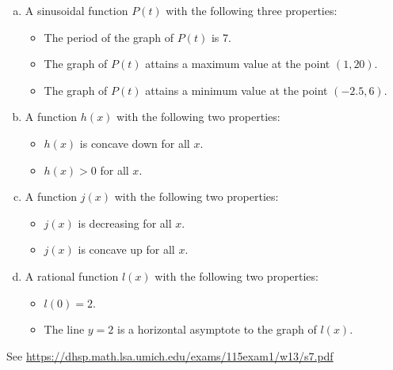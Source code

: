 \documentclass[11pt]{exam}
\begin{document}
\begin{questions}
\begin{enumerate}[(a)]
\item A sinusoidal function $P(t)$ with the following three properties:
\begin{itemize}
\item The period of the graph of $P(t)$ is 7.
\item The graph of $P(t)$ attains a maximum value at the point $(1, 20)$.
\item The graph of $P(t)$ attains a minimum value at the point $(-2.5,6)$.
\end{itemize}
\item A function $h(x)$ with the following two properties:
\begin{itemize}
\item $h(x)$ is concave down for all $x$.
\item $h(x)>0$ for all $x$.
\end{itemize}
\item A function $j(x)$ with the following two properties:
\begin{itemize}
\item $j(x)$ is decreasing for all $x$.
\item $j(x)$ is concave up for all $x$.
\end{itemize}
\item A rational function $l(x)$ with the following two properties:
\begin{itemize}
\item $l(0)=2$.
\item The line $y = 2$ is a horizontal asymptote to the graph of $l(x)$.
\end{itemize}
\end{enumerate}
\begin{solution}
  See \href{https://dhsp.math.lsa.umich.edu/exams/115exam1/w13/s7.pdf}{https://dhsp.math.lsa.umich.edu/exams/115exam1/w13/s7.pdf} 
\end{solution}
\end{questions}
\end{document}
